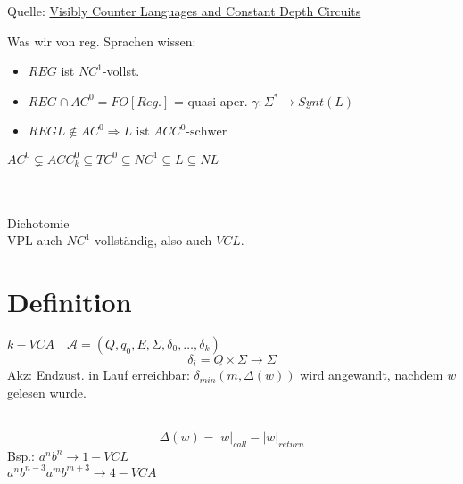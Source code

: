 Quelle: \href{http://drops.dagstuhl.de/opus/volltexte/2015/4944/pdf/44.pdf}{Visibly Counter Languages
and Constant Depth Circuits}

Was wir von reg. Sprachen wissen:
\begin{itemize}
\item $REG$ ist $NC^1$-vollst.
\item $REG\cap AC^0 = FO[Reg.]$
	= quasi aper. $\gamma:\Sigma^*\to Synt(L)$
\item $REG L \notin AC^0 \Rightarrow L \text{ ist } ACC^0 \text{-schwer}$
\end{itemize}
$AC^0 \subsetneq ACC_k^0 \subseteq TC^0 \subseteq NC^1 \subseteq L \subseteq NL$\\
\vspace{1cm}\\
\\
Dichotomie\\
VPL auch $NC^1$-vollständig, also auch $VCL$.

\section{Definition}
$k-VCA\quad\mathcal{A} = (Q, q_0, E, \Sigma, \delta_0, \dots, \delta_k)$\\
$$\delta_i = Q \times \Sigma \to \Sigma$$
Akz: Endzust. in Lauf erreichbar: $\delta_{min}(m, \Delta(w))$ wird angewandt, nachdem $w$ gelesen wurde.\\
\\
$$\Delta(w) = |w|_{call} - |w|_{return}$$
Bsp.: $a^nb^n \to 1-VCL$\\
$a^nb^{n-3}a^mb^{m+3} \to 4-VCA$

